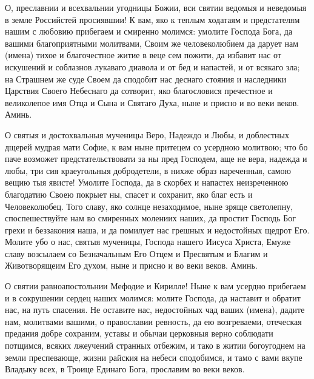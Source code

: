 О, преславнии и всехвальнии угодницы Божии, вси святии ведомыя и неведомыя в земле Российстей просиявшии! К вам, яко к теплым ходатаям и предстателям нашим с любовию прибегаем и смиренно молимся: умолите Господа Бога, да вашими благоприятными молитвами, Своим же человеколюбием да дарует нам (имена) тихое и благочестное житие в веце сем пожити, да избавит нас от искушений и соблазнов лукаваго диавола и от бед и напастей, и от всякаго зла; на Страшнем же суде Своем да сподобит нас деснаго стояния и наследники Царствия Своего Небеснаго да сотворит, яко благословися пречестное и великолепое имя Отца и Сына и Святаго Духа, ныне и присно и во веки веков. Аминь.


\bigskip\bigskip\mychapterending

 


О святыя и достохвальныя мученицы Веро, Надеждо и Любы, и доблестных дщерей мудрая мати Софие, к вам ныне притецем со усердною молитвою; что бо паче возможет предстательствовати за ны пред Господем, аще не вера, надежда и любы, три сия краеугольныя добродетели, в нихже образ нареченныя, самою вещию тыя явисте! Умолите Господа, да в скорбех и напастех неизреченною благодатию Своею покрыет ны, спасет и сохранит, яко благ есть и Человеколюбец. Того славу, яко солнце незаходимое, ныне зряще светолепну, споспешествуйте нам во смиренных молениих наших, да простит Господь Бог грехи и беззакония наша, и да помилует нас грешных и недостойных щедрот Его. Молите убо о нас, святыя мученицы, Господа нашего Иисуса Христа, Емуже славу возсылаем со Безначальным Его Отцем и Пресвятым и Благим и Животворящеим Его духом, ныне и присно и во веки веков. Аминь.


\bigskip\bigskip\mychapterending

 


О святии равноапостольнии Мефодие и Кирилле! Ныне к вам усердно прибегаем и в сокрушении сердец наших молимся: молите Господа, да наставит и обратит нас, на путь спасения. Не оставите нас, недостойных чад ваших (имена), дадите нам, молитвами вашими, о православии ревность, да ею возгреваеми, отеческая предания добре сохраним, уставы и обычаи церковныя верно соблюдати  потщимся, всяких лжеучений странных отбежим, и тако в житии богоугоднем на земли преспевающе, жизни райския на небеси сподобимся, и тамо с вами вкупе Владыку всех, в Троице Единаго Бога, прославим во веки веков.



